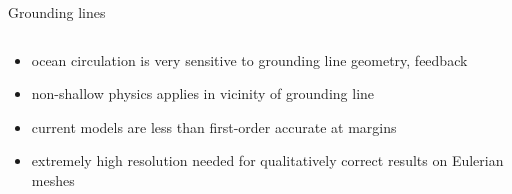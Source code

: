 \begin{frame}{Grounding lines}
\begin{columns}
\begin{column}{0.55\textwidth}
      \begin{itemize}
      \item ocean circulation is very sensitive to grounding line
        geometry, feedback
      \item non-shallow physics applies in vicinity of grounding line
      \item current models are less than first-order accurate at margins
      \item extremely high resolution needed for qualitatively correct
        results on Eulerian meshes
      \end{itemize}
    \end{column}
  \end{columns}
\end{frame}
